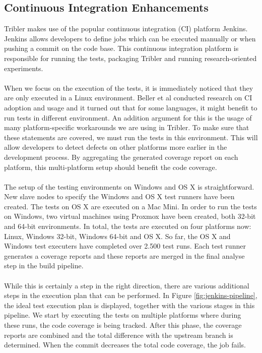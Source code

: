 \subsection{Continuous Integration Enhancements}
Tribler makes use of the popular continuous integration (CI) platform Jenkins. Jenkins allows developers to define jobs which can be executed manually or when pushing a commit on the code base. This continuous integration platform is responsible for running the tests, packaging Tribler and running research-oriented experiments.\\\\
When we focus on the execution of the tests, it is immediately noticed that they are only executed in a Linux environment. Beller et al\cite{beller2016oops} conducted research on CI adoption and usage and it turned out that for some languages, it might benefit to run tests in different environment. An addition argument for this is the usage of many platform-specific workarounds we are using in Tribler. To make sure that these statements are covered, we must run the tests in this environment. This will allow developers to detect defects on other platforms more earlier in the development process. By aggregating the generated coverage report on each platform, this multi-platform setup should benefit the code coverage.\\\\
The setup of the testing environments on Windows and OS X is straightforward. New slave nodes to specify the Windows and OS X test runners have been created. The tests on OS X are executed on a Mac Mini. In order to run the tests on Windows, two virtual machines using Proxmox have been created, both 32-bit and 64-bit environments. In total, the tests are executed on four platforms now: Linux, Windows 32-bit, Windows 64-bit and OS X. So far, the OS X and Windows test executers have completed over 2.500 test runs. Each test runner generates a coverage reports and these reports are merged in the final analyse step in the build pipeline.\\\\
While this is certainly a step in the right direction, there are various additional steps in the execution plan that can be performed. In Figure \ref{fig:jenkins-pipeline}, the ideal test execution plan is displayed, together with the various stages in this pipeline. We start by executing the tests on multiple platforms where during these runs, the code coverage is being tracked. After this phase, the coverage reports are combined and the total difference with the upstream branch is determined. When the commit decreases the total code coverage, the job fails.\\\\
